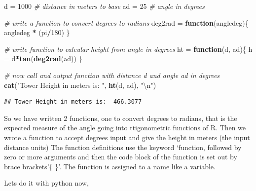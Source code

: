\documentclass[]{book}
\newenvironment{Shaded}{\begin{snugshade}}{\end{snugshade}}
\newcommand{\KeywordTok}[1]{\textcolor[rgb]{0.13,0.29,0.53}{\textbf{#1}}}
\newcommand{\DecValTok}[1]{\textcolor[rgb]{0.00,0.00,0.81}{#1}}
\newcommand{\CharTok}[1]{\textcolor[rgb]{0.31,0.60,0.02}{#1}}
\newcommand{\StringTok}[1]{\textcolor[rgb]{0.31,0.60,0.02}{#1}}
\newcommand{\CommentTok}[1]{\textcolor[rgb]{0.56,0.35,0.01}{\textit{#1}}}
\newcommand{\ControlFlowTok}[1]{\textcolor[rgb]{0.13,0.29,0.53}{\textbf{#1}}}
\newcommand{\OperatorTok}[1]{\textcolor[rgb]{0.81,0.36,0.00}{\textbf{#1}}}
\newcommand{\NormalTok}[1]{#1}
\theoremstyle{definition}
\theoremstyle{definition}
\theoremstyle{definition}
\theoremstyle{remark}
\begin{document}
\begin{Shaded}
\begin{Highlighting}[]
\NormalTok{d =}\StringTok{ }\DecValTok{1000}    \CommentTok{# distance in meters to base}
\NormalTok{ad =}\StringTok{ }\DecValTok{25}     \CommentTok{# angle in degrees}

\CommentTok{# write a function to convert degrees to radians}
\NormalTok{deg2rad =}\StringTok{ }\ControlFlowTok{function}\NormalTok{(angledeg)\{}
\NormalTok{  angledeg }\OperatorTok{*}\StringTok{ }\NormalTok{(pi}\OperatorTok{/}\DecValTok{180}\NormalTok{)}
\NormalTok{\}}

\CommentTok{# write function to calcular height from angle in degrees}
\NormalTok{ht =}\StringTok{ }\ControlFlowTok{function}\NormalTok{(d, ad)\{}
\NormalTok{  h =}\StringTok{ }\NormalTok{d}\OperatorTok{*}\KeywordTok{tan}\NormalTok{(}\KeywordTok{deg2rad}\NormalTok{(ad))}
\NormalTok{\}}

\CommentTok{# now call and output function with distance d and angle ad in degrees}
\KeywordTok{cat}\NormalTok{(}\StringTok{"Tower Height in meters is: "}\NormalTok{, }\KeywordTok{ht}\NormalTok{(d, ad), }\StringTok{"}\CharTok{\textbackslash{}n}\StringTok{"}\NormalTok{)    }
\end{Highlighting}
\end{Shaded}

\begin{verbatim}
## Tower Height in meters is:  466.3077
\end{verbatim}

So we have written 2 functions, one to convert degrees to radians, that
is the expected measure of the angle going into ttigonometric functions
of R. Then we wrote a function to accept degrees input and give the
height in meters (the input distance units) The function definitions use
the keyword `function, followed by zero or more arguments and then the
code block of the function is set out by brace brackets'\{ \}'. The
function is assigned to a name like a variable.

Lets do it with python now,
\end{document}
